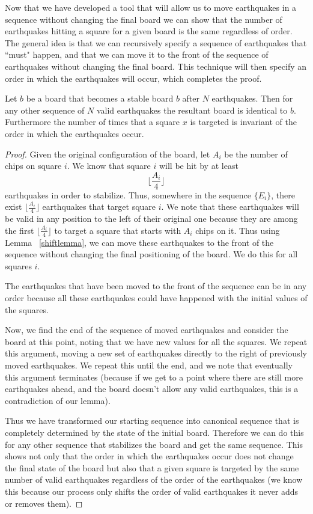 \documentclass[runningheads,a4paper]{llncs}
\begin{document}
Now that we have developed a tool that will allow us to move earthquakes in a sequence without changing the final board we can show that the number of earthquakes hitting a square for a given board is the same regardless of order. 
The general idea is that we can recursively specify a sequence of earthquakes that ``must" happen, and that we can move it to the front of the sequence of earthquakes without changing the final board. This technique will then specify an order in which the earthquakes will occur, which completes the proof.

\begin{theorem}
Let $b$ be a board that becomes a stable board $b$ after $N$ earthquakes. Then for any other sequence of $N$ valid earthquakes the resultant board is identical to $b$. Furthermore the number of times that a square $x$ is targeted is invariant of the order in which the earthquakes occur. 
\end{theorem}
\begin{proof}
Given the original configuration of the board, let $A_i$ be the number of chips on square $i$. We know that square $i$ will be hit by at least 
\begin{equation*}
\lfloor \frac{A_i}{4} \rfloor
\end{equation*}
earthquakes in order to stabilize. Thus, somewhere in the sequence $\{E_i\}$, there exist $\lfloor \frac{A_i}{4} \rfloor$ earthquakes that target  square $i$. We note that these earthquakes will be valid in any position to the left of their original one because they are among the first $\lfloor \frac{A_i}{4} \rfloor$ to target a square that starts with $A_i$ chips on it. Thus using Lemma ~\ref{shiftlemma}, we can move these earthquakes to the front of the sequence without changing the final positioning of the board. We do this for all squares $i$. 

The earthquakes that have been moved to the front of the sequence can be in any order because all these earthquakes could have happened with the initial values of the squares. 

Now, we find the end of the sequence of moved earthquakes and consider the board at this point, noting that we have new values for all the squares. We repeat this argument, moving a new set of earthquakes directly to the right of previously moved earthquakes. We repeat this until the end, and we note that eventually this argument terminates (because if we get to a point where there are still more earthquakes ahead, and the board doesn't allow any valid earthquakes, this is a contradiction of our lemma).

Thus we have transformed our starting sequence into canonical sequence that is completely determined by the state of the initial board. Therefore we can do this for any other sequence that stabilizes the board and get the same sequence. This shows not only that the order in which the earthquakes occur does not change the final state of the board but also that a given square is targeted by the same number of valid earthquakes regardless of the order of the earthquakes (we know this because our process only shifts the order of valid earthquakes it never adds or removes them). 
\end{proof}
\end{document}
